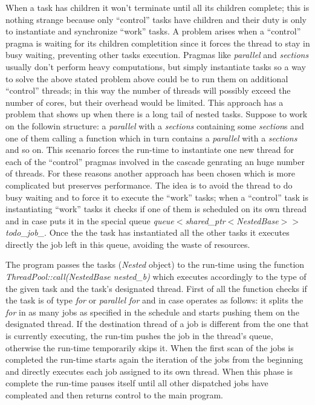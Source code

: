 \documentclass[a4paper,12pt,oneside]{book}
\begin{document}
When a task has children it won’t terminate until all its children complete; this is nothing strange because only “control” tasks have children and their duty is only to instantiate and synchronize “work” tasks. A problem arises when a “control” pragma is waiting for its children completition since it forces the thread to  stay in busy waiting, preventing other tasks execution. Pragmas like \emph{parallel} and \emph{sections} usually don’t perform heavy computations, but simply instantiate tasks so a way to solve the above stated problem above could be to run them on additional “control” threads; in this way the number of threads will possibly exceed the number of cores, but their overhead would be limited. This approach has a problem that shows up when there is a long tail of nested tasks. Suppose to work on the followin structure: a \emph{parallel} with a \emph{sections} containing some \emph{section}s and one of them calling a function which in turn contains a \emph{parallel} with a \emph{sections} and so on. This scenario forces the run-time to instantiate one new thread for each of the “control” pragmas involved in the cascade genrating an huge number of threads. For these reasons another approach has been chosen which is more complicated but preserves performance. The idea is to avoid the thread to do busy waiting and to force it to execute the “work” tasks; when a “control” task is instantiating “work” tasks it checks if one of them is scheduled on its own thread and in case puts it in the special queue \emph{queue$<$shared\_ptr$<$NestedBase$>>$ todo\_job\_}. Once the the task has instantiated all the other tasks it executes directly the job left in this queue, avoiding the waste of resources.

The program passes the tasks (\emph{Nested} object) to the run-time using the function \emph{ThreadPool::call(NestedBase nested\_b)} which executes accordingly to the type of the given task and the task's designated thread. First of all the function checks if the task is of type \emph{for} or \emph{parallel for} and in case operates as follows: it splits the \emph{for} in as many jobs as specified in the schedule and starts pushing them on the designated thread. If the destination thread of a job is different from the  one that is currently executing, the run-tim pushes the job in the thread’s queue, otherwise the run-time temporarily skips it. When the first scan of the jobs is completed the run-time starts again the iteration of the jobs from the beginning and directly executes each job assigned to its own thread. When this phase is complete the run-time pauses itself until all other dispatched jobs have compleated and then returns control to the main program. 
\end{document}
